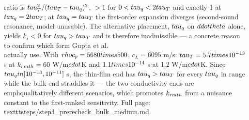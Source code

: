 \documentclass[11pt]{article}
\begin{document}
ratio is $\\tau_T^2/(\\tau_T-\\tau_q)^2$, $>1$ for $0<\\tau_q<2\\tau_T$ and exactly 1 at
$\\tau_q=2\\tau_T$; at $\\tau_q=\\tau_T$ the first-order expansion diverges (second-sound resonance, model
unusable). The alternative placement, $\\tau_q$ on $\\ddot\\theta$ alone, yields $k_i<0$ for
$\\tau_q>\\tau_T$ and is therefore inadmissible --- a concrete reason to confirm which form Gupta
et al.\\ actually use. With $\\rho c_p=5680\\times500$, $c_L=6095$ m/s: $\\tau_T=5.7\\times10^{-13}$ s at
$k_{\\rm th}=60$ W/m$\\cdot$K and $1.1\\times10^{-14}$ s at 1.2 W/m$\\cdot$K. Since
$\\tau_q\\in[10^{-13},10^{-11}]$ s, the thin-film end has $\\tau_q>\\tau_T$ for every $\\tau_q$ in range
while the bulk end straddles it --- the two conductivity ends are \\emph{qualitatively} different
scenarios, which promotes $k_{\\rm th}$ from a nuisance constant to the first-ranked sensitivity.
Full page: \\texttt{steps/step3\_prerecheck\_bulk\_medium.md}.
\end{document}
